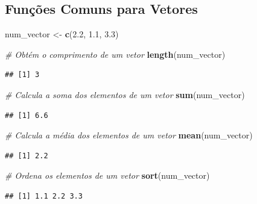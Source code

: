 \documentclass[
]{book}
\newenvironment{Shaded}{\begin{snugshade}}{\end{snugshade}}
\newcommand{\CommentTok}[1]{\textcolor[rgb]{0.56,0.35,0.01}{\textit{#1}}}
\newcommand{\FloatTok}[1]{\textcolor[rgb]{0.00,0.00,0.81}{#1}}
\newcommand{\FunctionTok}[1]{\textcolor[rgb]{0.13,0.29,0.53}{\textbf{#1}}}
\newcommand{\NormalTok}[1]{#1}
\newcommand{\OtherTok}[1]{\textcolor[rgb]{0.56,0.35,0.01}{#1}}
\theoremstyle{definition}
\theoremstyle{definition}
\theoremstyle{definition}
\theoremstyle{definition}
\theoremstyle{remark}
\begin{document}
\subsection{Funções Comuns para Vetores}\label{funuxe7uxf5es-comuns-para-vetores}

\begin{Shaded}
\begin{Highlighting}[]
\NormalTok{num\_vector }\OtherTok{\textless{}{-}} \FunctionTok{c}\NormalTok{(}\FloatTok{2.2}\NormalTok{, }\FloatTok{1.1}\NormalTok{, }\FloatTok{3.3}\NormalTok{)}

\CommentTok{\# Obtém o comprimento de um vetor}
\FunctionTok{length}\NormalTok{(num\_vector)}
\end{Highlighting}
\end{Shaded}

\begin{verbatim}
## [1] 3
\end{verbatim}

\begin{Shaded}
\begin{Highlighting}[]
\CommentTok{\# Calcula a soma dos elementos de um vetor}
\FunctionTok{sum}\NormalTok{(num\_vector)}
\end{Highlighting}
\end{Shaded}

\begin{verbatim}
## [1] 6.6
\end{verbatim}

\begin{Shaded}
\begin{Highlighting}[]
\CommentTok{\# Calcula a média dos elementos de um vetor}
\FunctionTok{mean}\NormalTok{(num\_vector)}
\end{Highlighting}
\end{Shaded}

\begin{verbatim}
## [1] 2.2
\end{verbatim}

\begin{Shaded}
\begin{Highlighting}[]
\CommentTok{\# Ordena os elementos de um vetor}
\FunctionTok{sort}\NormalTok{(num\_vector)}
\end{Highlighting}
\end{Shaded}

\begin{verbatim}
## [1] 1.1 2.2 3.3
\end{verbatim}
\end{document}
